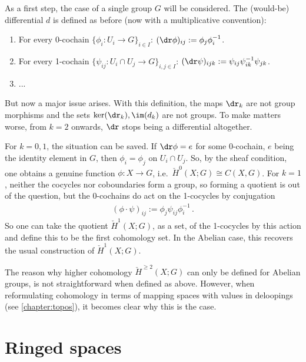     As a first step, the case of a single group $G$ will be considered. The (would-be) differential $d$ is defined as before (now with a multiplicative convention):
    \begin{enumerate}
        \item For every 0-cochain $\{\phi_i:U_i\rightarrow G\}_{i\in I}$: $(\dr\phi)_{ij}:=\phi_j\phi^{-1}_i$.
        \item For every 1-cochain $\{\psi_{ij}:U_i\cap U_j\rightarrow G\}_{i,j\in I}$: $(\dr\psi)_{ijk} := \psi_{ij}\psi^{-1}_{ik}\psi_{jk}$.
        \item ...
    \end{enumerate}
    But now a major issue arises. With this definition, the maps $\dr_k$ are not group morphisms and the sets $\ker(\dr_k),\im(d_k)$ are not groups. To make matters worse, from $k=2$ onwards, $\dr$ stops being a differential altogether.

    For $k=0,1$, the situation can be saved. If $\dr\phi=e$ for some 0-cochain, $e$ being the identity element in $G$, then $\phi_i=\phi_j$ on $U_i\cap U_j$. So, by the sheaf condition, one obtains a genuine function $\phi:X\rightarrow G$, i.e.~$\check{H}^0(X;G)\cong C(X,G)$. For $k=1$, neither the cocycles nor coboundaries form a group, so forming a quotient is out of the question, but the 0-cochains do act on the 1-cocycles by conjugation
    \begin{gather}
        (\phi\cdot\psi)_{ij} := \phi_j\psi_{ij}\phi^{-1}_i\,.
    \end{gather}
    So one can take the quotient $\check{H}^1(X;G)$, as a set, of the 1-cocycles by this action and define this to be the first cohomology set. In the Abelian case, this recovers the usual construction of $\check{H}^1(X;G)$.

    \begin{remark}
        The reason why higher cohomology $\check{H}^{\geq2}(X;G)$ can only be defined for Abelian groups, is not straightforward when defined as above. However, when reformulating cohomology in terms of mapping spaces with values in deloopings (see \cref{chapter:topos}), it becomes clear why this is the case.
    \end{remark}


\section{Ringed spaces}


